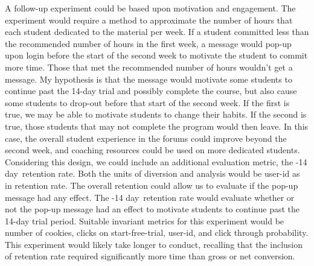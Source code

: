\documentclass[paper=a4, fontsize=11pt]{scrartcl} %
\numberwithin{equation}{section} %
\numberwithin{figure}{section} %
\numberwithin{table}{section} %
\begin{document}
A follow-up experiment could be based upon motivation and engagement.  The experiment would require a method to approximate the number of hours that each student dedicated to the material per week.  If a student committed less than the recommended number of hours in the first week, a message would pop-up upon login before the start of the second week to motivate the student to commit more time.  Those that met the recommended number of hours wouldn't get a message. \newline \newline
My hypothesis is that the message would motivate some students to continue past the 14-day trial and possibly complete the course, but also cause some students to drop-out before that start of the second week.  If the first is true, we may be able to motivate students to change their habits.  If the second is true, those students that may not complete the program would then leave.  In this case, the overall student experience in the forums could improve beyond the second week, and coaching resources could be used on more dedicated students. \newline
\newline
Considering this design, we could include an additional evaluation metric, the -14 day\textquotesingle \ retention rate.  Both the units of diversion and analysis would be user-id as in retention rate.  The overall retention could allow us to evaluate if the pop-up message had any effect.  The -14 day\textquotesingle \ retention rate would evaluate whether or not the pop-up message had an effect to motivate students to continue past the 14-day trial period.  Suitable invariant metrics for this experiment would be number of cookies, clicks on start-free-trial, user-id, and click through probability.  This experiment would likely take longer to conduct, recalling that the inclusion of retention rate required significantly more time than gross or net conversion.
\end{document}
